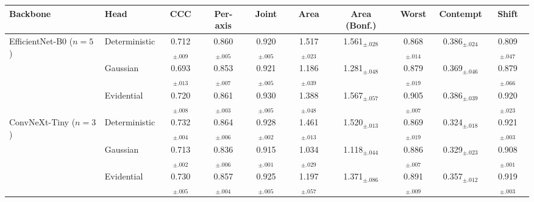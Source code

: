 \begin{tabular}{llcccccccc}
\toprule
Backbone & Head & CCC & Per-axis & Joint & Area & Area (Bonf.) & Worst & Contempt & Shift \\
\midrule
EfficientNet-B0 ($n=5$) & Deterministic & 0.712$_{\pm.009}$ & 0.860$_{\pm.005}$ & 0.920$_{\pm.005}$ & 1.517$_{\pm.023}$ & 1.561$_{\pm.028}$ & 0.868$_{\pm.014}$ & 0.386$_{\pm.024}$ & 0.809$_{\pm.047}$ \\
 & Gaussian & 0.693$_{\pm.013}$ & 0.853$_{\pm.007}$ & 0.921$_{\pm.005}$ & 1.186$_{\pm.039}$ & 1.281$_{\pm.048}$ & 0.879$_{\pm.019}$ & 0.369$_{\pm.046}$ & 0.879$_{\pm.066}$ \\
 & Evidential & 0.720$_{\pm.008}$ & 0.861$_{\pm.003}$ & 0.930$_{\pm.005}$ & 1.388$_{\pm.048}$ & 1.567$_{\pm.057}$ & 0.905$_{\pm.007}$ & 0.386$_{\pm.039}$ & 0.920$_{\pm.023}$ \\
\midrule
ConvNeXt-Tiny ($n=3$) & Deterministic & 0.732$_{\pm.004}$ & 0.864$_{\pm.006}$ & 0.928$_{\pm.002}$ & 1.461$_{\pm.013}$ & 1.520$_{\pm.013}$ & 0.869$_{\pm.019}$ & 0.324$_{\pm.018}$ & 0.921$_{\pm.003}$ \\
 & Gaussian & 0.713$_{\pm.002}$ & 0.836$_{\pm.006}$ & 0.915$_{\pm.001}$ & 1.034$_{\pm.029}$ & 1.118$_{\pm.044}$ & 0.886$_{\pm.007}$ & 0.329$_{\pm.023}$ & 0.908$_{\pm.001}$ \\
 & Evidential & 0.730$_{\pm.005}$ & 0.857$_{\pm.004}$ & 0.925$_{\pm.005}$ & 1.197$_{\pm.057}$ & 1.371$_{\pm.086}$ & 0.891$_{\pm.009}$ & 0.357$_{\pm.012}$ & 0.919$_{\pm.003}$ \\
\bottomrule
\end{tabular}
